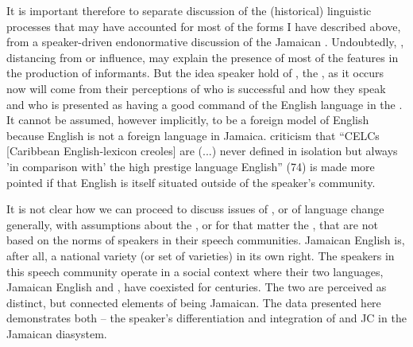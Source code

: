 It is important therefore to separate discussion of the (historical) linguistic processes that may have accounted for most of the forms I have described above, from a speaker-driven endonormative discussion of the Jamaican .  Undoubtedly, , distancing from  or  influence, may explain the presence of most of the features in the production of informants.  But the idea speaker hold of , the , as it occurs now will come from their perceptions of who is successful and how they speak and who is presented as having a good command of the English language in the .  It cannot be assumed, however implicitly, to be a foreign model of English because English is not a foreign language in Jamaica.   criticism that “CELCs [Caribbean English-lexicon creoles] are (...) never defined in isolation but always 'in comparison with' the high prestige language English” (74) is made more pointed if that English is itself situated outside of the speaker’s community.

It is not clear how we can proceed to discuss issues of , or of language change generally, with assumptions about the , or for that matter the , that are not based on the norms of speakers in their speech communities.  Jamaican English is, after all, a national variety (or set of varieties) in its own right.  The speakers in this speech community operate in a social context where their two languages, Jamaican English and , have coexisted for centuries.  The two are perceived as distinct, but connected elements of being Jamaican.  The data presented here demonstrates both – the speaker’s differentiation and integration of  and JC in the Jamaican diasystem.
